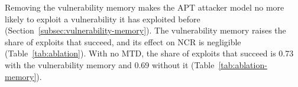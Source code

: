\documentclass{cshonours}
\newcommand{\prelim}[1]{#1}
\begin{document}
Removing the vulnerability memory makes the APT attacker model no more likely
to exploit a vulnerability it has exploited before
(Section~\ref{subsec:vulnerability-memory}). The vulnerability memory raises
the share of exploits that succeed, and its effect on NCR is negligible
(Table~\ref{tab:ablation}). With no MTD, the share of exploits that succeed is
0.73 with the vulnerability memory and 0.69 without it
(Table~\ref{tab:ablation-memory}).
\end{document}
